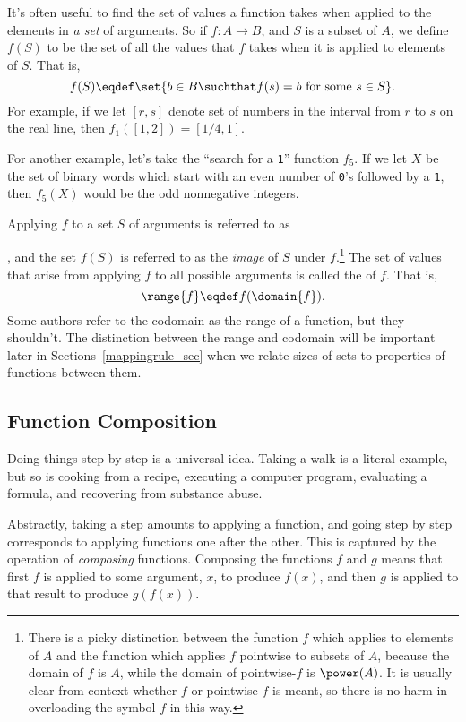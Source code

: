It's often useful to find the set of values a function takes when applied
to the elements in \emph{a set} of arguments.  So if $f:A \to B$, and $S$
is a subset of $A$, we define $f(S)$ to be the set of all the values that
$f$ takes when it is applied to elements of $S$.  That is,
\[
f(S) \eqdef \set{b \in B \suchthat f(s) = b \text{ for some } s
  \in S}.
\]
For example, if we let $[r,s]$ denote set of numbers in the
interval from $r$ to $s$ on the real line, then $f_1([1,2]) =
[1/4,1]$.

For another example, let's take the ``search for a \texttt{1}''
function $f_5$.  If we let $X$ be the set of binary words which
start with an even number of \texttt{0}'s followed by a
\texttt{1}, then $f_5(X)$ would be the odd nonnegative integers.

Applying $f$ to a set $S$ of arguments is referred to as
, and the set $f(S)$ is referred to as the \emph{image}%
 of $S$ under $f$.\footnote{There is a picky distinction
  between the function $f$ which applies to elements of $A$ and the
  function which applies $f$ pointwise to subsets of $A$, because the
  domain of $f$ is $A$, while the domain of pointwise-$f$ is
  $\power(A)$.  It is usually clear from context whether $f$ or
  pointwise-$f$ is meant, so there is no harm in overloading the
  symbol $f$ in this way.}  The set of values that arise from applying
$f$ to all possible arguments is called the  of $f$.  That
is,
\[
\range{f} \eqdef f(\domain{f}).
\]
Some authors refer to the codomain as the range of a function, but
they shouldn't.  The distinction between the range and codomain will
be important later in Sections~\ref{mappingrule_sec} when we
relate sizes of sets to properties of functions between them.

\subsection{Function Composition}\label{func_compose_subsec}

Doing things step by step is a universal idea.  Taking a walk is a literal
example, but so is cooking from a recipe, executing a computer program,
evaluating a formula, and recovering from substance abuse.

Abstractly, taking a step amounts to applying a function, and going step
by step corresponds to applying functions one after the other.  This is
captured by the operation of \emph{composing}%
functions.  Composing the
functions $f$ and $g$ means that first $f$ is applied to some argument,
$x$, to produce $f(x)$, and then $g$ is applied to that result to produce
$g(f(x))$.

